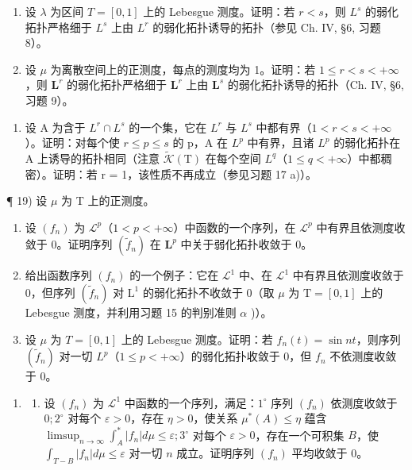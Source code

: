 \begin{enumerate}
\def\labelenumi{\alph{enumi})}
\setcounter{enumi}{1}
\item
  设 \(\lambda\) 为区间 \(T = [0,1]\) 上的 Lebesgue 测度。证明：若 \(r < s\)，则 \(L^s\) 的弱化拓扑严格细于 \(L^s\) 上由 \(L^r\) 的弱化拓扑诱导的拓扑（参见 Ch. IV, §6, 习题 8）。
\item
  设 \(\mu\) 为离散空间上的正测度，每点的测度均为 1。证明：若 \(1 \leqslant r < s < +\infty\)，则 \(\mathbf{L}^r\) 的弱化拓扑严格细于 \(\mathbf{L}^r\) 上由 \(\mathbf{L}^s\) 的弱化拓扑诱导的拓扑（Ch. IV, §6, 习题 9）。
\end{enumerate}

\begin{enumerate}
\def\labelenumi{\arabic{enumi})}
\setcounter{enumi}{17}
\tightlist
\item
  设 A 为含于 \(L^{r} \cap L^{s}\) 的一个集，它在 \(L^{r}\) 与 \(L^{s}\) 中都有界（\(1 < r < s < +\infty\)）。证明：对每个使 \(r \leqslant p \leqslant s\) 的 p，A 在 \(L^{p}\) 中有界，且诸 \(L^{p}\) 的弱化拓扑在 A 上诱导的拓扑相同（注意 \(\widetilde{\mathcal{K}}(\mathrm{T})\) 在每个空间 \(L^{q}\)（\(1 \leqslant q < +\infty\)）中都稠密）。证明：若 r = 1，该性质不再成立（参见习题 17 a)）。
\end{enumerate}

¶ 19) 设 \(\mu\) 为 T 上的正测度。

\begin{enumerate}
\def\labelenumi{\alph{enumi})}
\item
  设 \((f_n)\) 为 \(\mathcal{L}^p\)（\(1 < p < +\infty\)）中函数的一个序列，在 \(\mathcal{L}^p\) 中有界且依测度收敛于 0。证明序列 \((\widetilde{f}_n)\) 在 \(\mathbf{L}^p\) 中关于弱化拓扑收敛于 0。
\item
  给出函数序列 \((f_n)\) 的一个例子：它在 \(\mathcal{L}^1\) 中、在 \(\mathcal{L}^1\) 中有界且依测度收敛于 0，但序列 \((\widetilde{f}_n)\) 对 \(\mathrm{L}^1\) 的弱化拓扑不收敛于 0（取 \(\mu\) 为 \(\mathrm{T} = [0,1]\) 上的 Lebesgue 测度，并利用习题 15 的判别准则 \(\alpha\) )）。
\item
  设 \(\mu\) 为 \(T = [0,1]\) 上的 Lebesgue 测度。证明：若 \(f_{n}(t) = \sin nt\)，则序列 \((\widetilde{f}_n)\) 对一切 \(L^{p}\)（\(1 \leqslant p < +\infty\)）的弱化拓扑收敛于 0，但 \(f_{n}\) 不依测度收敛于 0。
\end{enumerate}

\begin{enumerate}
\def\labelenumi{\arabic{enumi})}
\setcounter{enumi}{19}
\tightlist
\item
  \begin{enumerate}
  \def\labelenumii{\alph{enumii})}
  \tightlist
  \item
    设 \((f_n)\) 为 \(\mathcal{L}^1\) 中函数的一个序列，满足：\(1^\circ\) 序列 \((f_n)\) 依测度收敛于 \(0; 2^\circ\) 对每个 \(\varepsilon > 0\)，存在 \(\eta > 0\)，使关系 \(\mu^*(A) \leqslant \eta\) 蕴含 \(\limsup_{n \to \infty} \int_A^* |f_n| d\mu \leqslant \varepsilon; 3^\circ\) 对每个 \(\varepsilon > 0\)，存在一个可积集 \(B\)，使 \(\int_{T - B} |f_n| d\mu \leqslant \varepsilon\) 对一切 \(n\) 成立。证明序列 \((f_n)\) 平均收敛于 \(0\)。
  \end{enumerate}
\end{enumerate}

